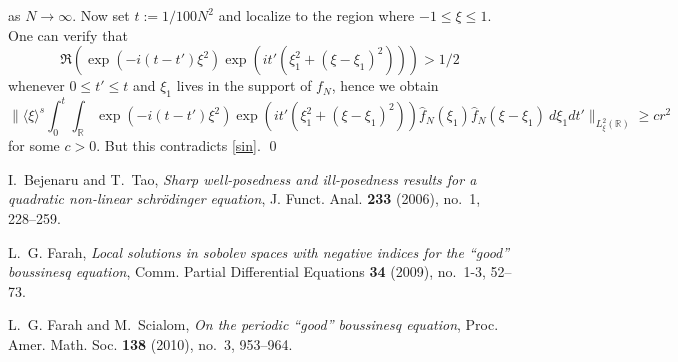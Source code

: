 \documentclass[12pt,reqno]{amsart}
\numberwithin{equation}{section}  %
\newcommand{\R}{\mathbb{R}}
\begin{document}
as $N \to \infty$.
Now set $t := 1/100N^2$ and localize to the region where $-1 \leq \xi \leq 1$.  One can verify that
$$ \Re( \exp(-i(t-t')\xi^2) \exp(it' (\xi_1^2 + (\xi-\xi_1)^2) )) > 1/2$$
whenever $0 \leq t' \leq t$ and $\xi_1$ lives in the support of $f_{N}$, hence we obtain
$$ 
\| \langle \xi \rangle^{s}
\int_0^t \int_\R \exp(-i(t-t')\xi^2) \exp(it' (\xi_1^2 + (\xi-\xi_1)^2)) \hat f_N(\xi_1) \hat f_N(\xi-\xi_1)\ d\xi_1 dt'
\|_{L^2_\xi(\R)} \geq c r^2$$
for some $c > 0$.  But this contradicts \eqref{sin}. \qed
%
\providecommand{\bysame}{\leavevmode\hbox to3em{\hrulefill}\thinspace}
\providecommand{\MR}{\relax\ifhmode\unskip\space\fi MR }
\providecommand{\MRhref}[2]{%
  \href{http://www.ams.org/mathscinet-getitem?mr=#1}{#2}
}
\providecommand{\href}[2]{#2}
\begin{thebibliography}{Far09}

I.~Bejenaru and T.~Tao, \emph{Sharp well-posedness and ill-posedness results
  for a quadratic non-linear schr{\"o}dinger equation}, J. Funct. Anal.
  \textbf{233} (2006), no.~1, 228--259.

L.~G. Farah, \emph{Local solutions in sobolev spaces with negative indices for
  the ``good'' boussinesq equation}, Comm. Partial Differential Equations
  \textbf{34} (2009), no.~1-3, 52--73.

L.~G. Farah and M.~Scialom, \emph{On the periodic ``good'' boussinesq
  equation}, Proc. Amer. Math. Soc. \textbf{138} (2010), no.~3, 953--964.

\end{thebibliography}
%
%
%
\end{document}
